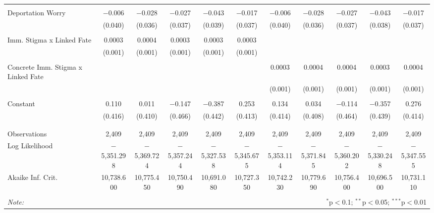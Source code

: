 \begin{table}[!htbp]
\begin{tabular}{@{\extracolsep{5pt}}lcccccccccc}
  & & & & & & & & & & \\ 
 Deportation Worry & $-$0.006 & $-$0.028 & $-$0.027 & $-$0.043 & $-$0.017 & $-$0.006 & $-$0.028 & $-$0.027 & $-$0.043 & $-$0.017 \\ 
  & (0.040) & (0.036) & (0.037) & (0.039) & (0.037) & (0.040) & (0.036) & (0.037) & (0.038) & (0.037) \\ 
  & & & & & & & & & & \\ 
 Imm. Stigma x Linked Fate & 0.0003 & 0.0004 & 0.0003 & 0.0003 & 0.0003 &  &  &  &  &  \\ 
  & (0.001) & (0.001) & (0.001) & (0.001) & (0.001) &  &  &  &  &  \\ 
  & & & & & & & & & & \\ 
 Concrete Imm. Stigma x Linked Fate &  &  &  &  &  & 0.0003 & 0.0004 & 0.0004 & 0.0003 & 0.0004 \\ 
  &  &  &  &  &  & (0.001) & (0.001) & (0.001) & (0.001) & (0.001) \\ 
  & & & & & & & & & & \\ 
 Constant & 0.110 & 0.011 & $-$0.147 & $-$0.387 & 0.253 & 0.134 & 0.034 & $-$0.114 & $-$0.357 & 0.276 \\ 
  & (0.416) & (0.410) & (0.466) & (0.442) & (0.413) & (0.414) & (0.408) & (0.464) & (0.439) & (0.414) \\ 
  & & & & & & & & & & \\ 
\hline \\[-1.8ex] 
Observations & 2,409 & 2,409 & 2,409 & 2,409 & 2,409 & 2,409 & 2,409 & 2,409 & 2,409 & 2,409 \\ 
Log Likelihood & $-$5,351.298 & $-$5,369.724 & $-$5,357.244 & $-$5,327.538 & $-$5,345.675 & $-$5,353.114 & $-$5,371.845 & $-$5,360.202 & $-$5,330.248 & $-$5,347.555 \\ 
Akaike Inf. Crit. & 10,738.600 & 10,775.450 & 10,750.490 & 10,691.080 & 10,727.350 & 10,742.230 & 10,779.690 & 10,756.400 & 10,696.500 & 10,731.110 \\ 
\hline 
\hline \\[-1.8ex] 
\textit{Note:}  & \multicolumn{10}{r}{$^{*}$p$<$0.1; $^{**}$p$<$0.05; $^{***}$p$<$0.01} \\ 
\end{tabular} 
\end{table} 

